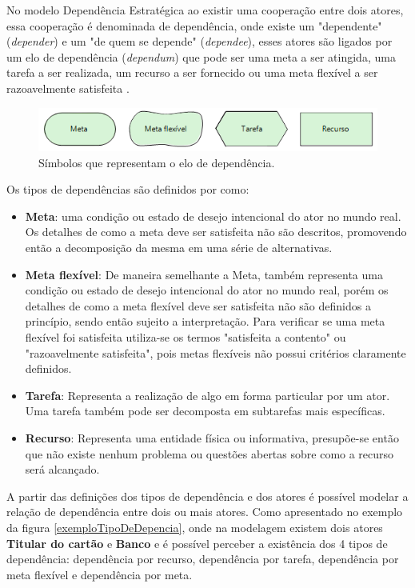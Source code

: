 No modelo Dependência Estratégica ao existir uma cooperação entre dois atores, essa cooperação é denominada de dependência, onde existe um "dependente" (\textit{depender}) e um "de quem se depende" (\textit{dependee}), esses atores são ligados por um elo de dependência (\textit{dependum}) que pode ser uma meta a ser atingida, uma tarefa a ser realizada, um recurso a ser fornecido ou uma meta flexível a ser razoavelmente satisfeita \cite{napolitano2009estrategia}. 

\begin{figure}[h!]
	\centering
	\includegraphics[keepaspectratio=true,scale=1.0]{figuras/TiposDeContribuicao.png}
	\caption{Símbolos que representam o elo de dependência.}
	\label{dependenciaIstar}
\end{figure} 

Os tipos de dependências são definidos por \cite{istarwiki20} como: 

\begin{itemize}
	\item \textbf{Meta}: uma condição ou estado de desejo intencional do ator no mundo real. Os detalhes de como a meta deve ser satisfeita não são descritos, promovendo então a decomposição da mesma em uma série de alternativas.   
	\item \textbf{Meta flexível}: De maneira semelhante a Meta, também representa uma condição ou estado de desejo intencional do ator no mundo real, porém os detalhes de como a meta flexível deve ser satisfeita não são definidos a princípio, sendo então sujeito a interpretação. Para verificar se uma meta flexível foi satisfeita utiliza-se os termos "satisfeita a contento" ou "razoavelmente satisfeita", pois metas flexíveis não possui critérios claramente definidos. 
	\item \textbf{Tarefa}: Representa a realização de algo em forma particular por um ator. Uma tarefa também pode ser decomposta em subtarefas mais específicas. 
	\item \textbf{Recurso}: Representa uma entidade física ou informativa, presupõe-se então que não existe nenhum problema ou questões abertas sobre como a recurso será alcançado. 
\end{itemize}

A partir das definições dos tipos de dependência e dos atores é possível modelar a relação de dependência entre dois ou mais atores. Como apresentado no exemplo da figura \ref{exemploTipoDeDepencia}, onde na modelagem existem dois atores \textbf{Titular do cartão} e \textbf{Banco} e é possível perceber a existência dos 4 tipos de dependência: dependência por recurso, dependência por tarefa, dependência por meta flexível e dependência por meta.  

